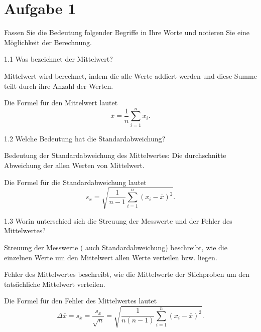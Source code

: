 \section{Aufgabe 1}
\label{sec:Aufgabe 1}
Fassen Sie die Bedeutung folgender Begriffe in Ihre Worte und notieren Sie eine Möglichkeit der Berechnung.


1.1 Was bezeichnet der Mittelwert?

 Mittelwert wird berechnet, indem die alle Werte addiert werden und diese Summe teilt durch ihre Anzahl der Werten.

 Die Formel für den Mittelwert lautet
 \begin{equation}
    \bar{x}=\frac{1}{n}\sum_{i=1}^n x_i .
\end{equation}



1.2 Welche Bedeutung hat die Standardabweichung?

Bedeutung der Standardabweichung des Mittelwertes: Die durchschnitte Abweichung der allen Werten von Mittelwert.

Die Formel für die Standardabweichung lautet
\begin{equation}
    s_x=\sqrt{\frac{1}{n-1}\sum_{i=1}^n {(x_i-\bar{x})^2 }}.
\end{equation}



1.3 Worin unterschied sich die Streuung der Messwerte und der Fehler des Mittelwertes?

Streuung der Messwerte ( auch Standardabweichung) beschreibt, wie die einzelnen Werte um den Mittelwert allen Werte verteilen bzw. liegen.

Fehler des Mittelwertes beschreibt, wie die Mittelwerte der Stichproben um den tatsächliche Mittelwert verteilen.

Die Formel für den Fehler des Mittelwertes lautet
\begin{equation}
    \Delta \bar{x} = s_{\bar{x}}=\frac{s_x}{\sqrt{n}}= \sqrt{\frac{1}{n(n-1)}\sum_{i=1}^n {(x_i-\bar{x})^2 }}.
\end{equation}



